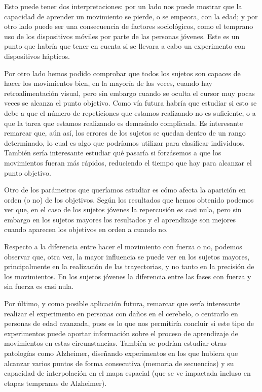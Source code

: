 \documentclass[a4paper,11pt, oneside]{book}
\begin{document}
Esto puede tener dos interpretaciones: por un lado nos puede mostrar que la capacidad de aprender un movimiento se pierde, o se empeora, con la edad; y por otro lado puede ser una consecuencia de factores sociológicos, como el temprano uso de los dispositivos móviles por parte de las personas jóvenes. Este es un punto que habría que tener en cuenta si se llevara a cabo un experimento con dispositivos hápticos.

Por otro lado hemos podido comprobar que todos los sujetos son capaces de hacer los movimientos bien, en la mayoría de las veces, cuando hay retroalimentación visual, pero sin embargo cuando se oculta el cursor muy pocas veces se alcanza el punto objetivo. Como vía futura habría que estudiar si esto se debe a que el número de repeticiones que estamos realizando no es suficiente, o a que la tarea que estamos realizando es demasiado complicada. Es interesante remarcar que, aún así, los errores de los sujetos se quedan dentro de un rango determinado, lo cual es algo que podríamos utilizar para clasificar individuos. También sería interesante estudiar qué pasaría si forzásemos a que los movimientos fueran más rápidos, reduciendo el tiempo que hay para alcanzar el punto objetivo.

Otro de los parámetros que queríamos estudiar es cómo afecta la aparición en orden (o no) de los objetivos. Según los resultados que hemos obtenido podemos ver que, en el caso de los sujetos jóvenes la repercusión es casi nula, pero sin embargo en los sujetos mayores los resultados y el aprendizaje son mejores cuando aparecen los objetivos en orden a cuando no.


Respecto a la diferencia entre hacer el movimiento con fuerza o no, podemos observar que, otra vez, la mayor influencia se puede ver en los sujetos mayores, principalmente en la realización de las trayectorias, y no tanto en la precisión de los movimientos. En los sujetos jóvenes la diferencia entre las fases con fuerza y sin fuerza es casi nula.

Por último, y como posible aplicación futura, remarcar que sería interesante realizar el experimento en personas con daños en el cerebelo, o centrarlo en personas de edad avanzada, pues es lo que nos permitiría concluir si este tipo de experimentos puede aportar información sobre el proceso de aprendizaje de movimientos en estas circunstancias.
También se podrían estudiar otras patologías como Alzheimer, diseñando experimentos en los que hubiera que alcanzar varios puntos de forma consecutiva (memoria de secuencias) y su capacidad de interpolación en el mapa espacial (que se ve impactada incluso en etapas tempranas de Alzheimer).
\end{document}
